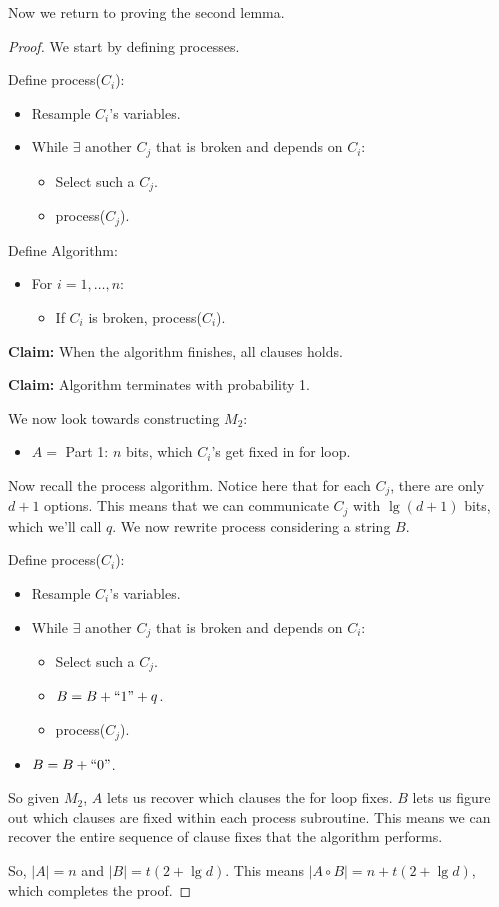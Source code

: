 \documentclass{report}
\begin{document}
    \noindent Now we return to proving the second lemma. 
    \begin{proof}
    We start by defining processes.

    \noindent Define process($C_i$):
    \begin{itemize}
        \item Resample $C_i$'s variables.
        \item While $\exists$ another $C_j$ that is broken and depends on $C_i$:
        \begin{itemize}
            \item Select such a $C_j$.
            \item process($C_j$).
        \end{itemize}
    \end{itemize}


    \noindent Define Algorithm:
    \begin{itemize}
        \item For $i = 1, \ldots, n$:
        \begin{itemize}
            \item If $C_i$ is broken, process($C_i$).
        \end{itemize}
    \end{itemize}
    \textbf{Claim:} When the algorithm finishes, all clauses holds.

    \noindent \textbf{Claim:} Algorithm terminates with probability 1.

    \noindent We now look towards constructing $M_2$:
    \begin{itemize}
        \item $A =$ Part 1: $n$ bits, which $C_i$'s get fixed in for loop.
    \end{itemize}
    Now recall the process algorithm. Notice here that for each $C_j$, there are only $d+1$ options. This means that we can communicate $C_j$ with $\lg(d+1)$ bits, which we'll call $q$. We now rewrite process considering a string $B$.

    \noindent Define process($C_i$):
    \begin{itemize}
        \item Resample $C_i$'s variables.
        \item While $\exists$ another $C_j$ that is broken and depends on $C_i$:
        \begin{itemize}
            \item Select such a $C_j$.
            \item $B = B + ``1" + q$.
            \item process($C_j$).
        \end{itemize}
        \item $B = B + ``0"$.
    \end{itemize}
So given $M_2$, $A$ lets us recover which clauses the for loop fixes. $B$ lets us figure out which clauses are fixed within each process subroutine. This means we can recover the entire sequence of clause fixes that the algorithm performs.

So, $|A| = n$ and $|B| = t(2 + \lg d)$. This means $|A \circ B| = n + t(2 + \lg d)$, which completes the proof.
\end{proof} 
\end{document}
